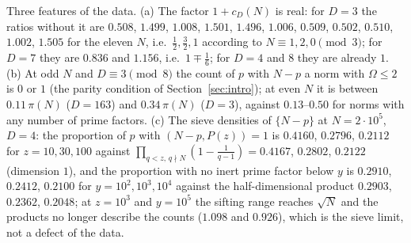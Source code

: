 \documentclass[11pt]{amsart}
\theoremstyle{definition}
\theoremstyle{remark}
\begin{document}
Three features of the data. (a) The factor $1+c_D(N)$ is real: for $D=3$ the ratios without it are $0.508$, $1.499$, $1.008$, $1.501$, $1.496$, $1.006$, $0.509$, $0.502$, $0.510$, $1.002$, $1.505$ for the eleven $N$, i.e.\ $\frac12,\frac32,1$ according to $N\equiv1,2,0\pmod3$; for $D=7$ they are $0.836$ and $1.156$, i.e.\ $1\mp\frac16$; for $D=4$ and $8$ they are already $1$. (b) At odd $N$ and $D\equiv3\pmod8$ the count of $p$ with $N-p$ a norm with $\Omega\le2$ is $0$ or $1$ (the parity condition of Section~\ref{sec:intro}); at even $N$ it is between $0.11\,\pi(N)$ ($D=163$) and $0.34\,\pi(N)$ ($D=3$), against $0.13$--$0.50$ for norms with any number of prime factors. (c) The sieve densities of $\{N-p\}$ at $N=2\cdot10^5$, $D=4$: the proportion of $p$ with $(N-p,P(z))=1$ is $0.4160$, $0.2796$, $0.2112$ for $z=10,30,100$ against $\prod_{q<z,\,q\nmid N}(1-\frac1{q-1})=0.4167$, $0.2802$, $0.2122$ (dimension $1$), and the proportion with no inert prime factor below $y$ is $0.2910$, $0.2412$, $0.2100$ for $y=10^2,10^3,10^4$ against the half-dimensional product $0.2903$, $0.2362$, $0.2048$; at $z=10^3$ and $y=10^5$ the sifting range reaches $\sqrt N$ and the products no longer describe the counts ($1.098$ and $0.926$), which is the sieve limit, not a defect of the data.
\end{document}
